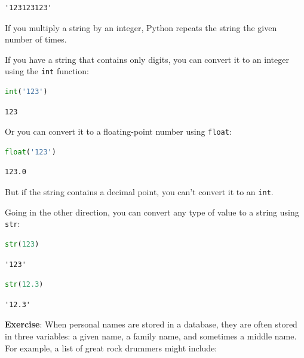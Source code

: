 \begin{lstlisting}[style=output]
'123123123'
\end{lstlisting}

If you multiply a string by an integer, Python repeats the string the
given number of times.

If you have a string that contains only digits, you can convert it to an
integer using the \passthrough{\lstinline!int!} function:

\begin{lstlisting}[language=Python,style=source]
int('123')
\end{lstlisting}

\begin{lstlisting}[style=output]
123
\end{lstlisting}

Or you can convert it to a floating-point number using
\passthrough{\lstinline!float!}:

\begin{lstlisting}[language=Python,style=source]
float('123')
\end{lstlisting}

\begin{lstlisting}[style=output]
123.0
\end{lstlisting}

But if the string contains a decimal point, you can't convert it to an
\passthrough{\lstinline!int!}.

Going in the other direction, you can convert any type of value to a
string using \passthrough{\lstinline!str!}:

\begin{lstlisting}[language=Python,style=source]
str(123)
\end{lstlisting}

\begin{lstlisting}[style=output]
'123'
\end{lstlisting}

\begin{lstlisting}[language=Python,style=source]
str(12.3)
\end{lstlisting}

\begin{lstlisting}[style=output]
'12.3'
\end{lstlisting}

\textbf{Exercise}: When personal names are stored in a database, they
are often stored in three variables: a given name, a family name, and
sometimes a middle name. For example, a list of great rock drummers
might include:

